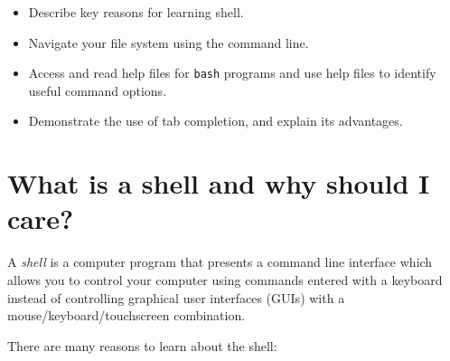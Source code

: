 \documentclass[
  letterpaper,
  DIV=11,
  numbers=noendperiod]{scrreprt}
\providecommand{\tightlist}{%
  \setlength{\itemsep}{0pt}\setlength{\parskip}{0pt}}\usepackage{longtable,booktabs,array}
\begin{document}
\begin{tcolorbox}[enhanced jigsaw, opacitybacktitle=0.6, colback=white, coltitle=black, opacityback=0, rightrule=.15mm, toptitle=1mm, toprule=.15mm, bottomtitle=1mm, colframe=quarto-callout-important-color-frame, arc=.35mm, titlerule=0mm, colbacktitle=quarto-callout-important-color!10!white, leftrule=.75mm, title={🎯 Objectives}, breakable, bottomrule=.15mm, left=2mm]

\begin{itemize}
\tightlist
\item
  Describe key reasons for learning shell.
\item
  Navigate your file system using the command line.
\item
  Access and read help files for \texttt{bash} programs and use help
  files to identify useful command options.
\item
  Demonstrate the use of tab completion, and explain its advantages.
\end{itemize}

\end{tcolorbox}

\section{What is a shell and why should I
care?}\label{what-is-a-shell-and-why-should-i-care}

A \emph{shell} is a computer program that presents a command line
interface which allows you to control your computer using commands
entered with a keyboard instead of controlling graphical user interfaces
(GUIs) with a mouse/keyboard/touchscreen combination.

There are many reasons to learn about the shell:
\end{document}
